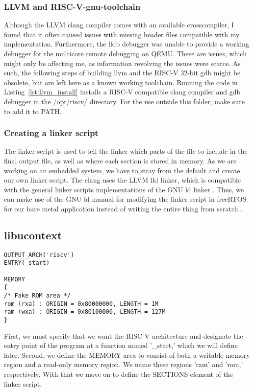 \subsubsection*{LLVM and RISC-V-gnu-toolchain}
Although the LLVM clang compiler comes with an available crosscompiler, I found
that it often caused issues with missing header files compatible with my
implementation. Furthermore, the lldb debugger was unable to provide a working
debugger for the multicore remote debugging on QEMU. These are issues, which
might only be affecting me, as information revolving the issues were scarce. As
such, the following steps of building llvm and the RISC-V 32-bit gdb might be
obsolete, but are left here as a known working toolchain. Running the code in
Listing~\ref{lst:llvm_install} installs a RISC-V compatible clang compiler and
gdb debugger in the /opt/riscv/ directory. For the use outside this folder, make
sure to add it to PATH.


\subsubsection{Creating a linker script}
The linker script is used to tell the linker which parts of the file to include
in the final output file, as well as where each section is stored in memory. As
we are working on an embedded system, we have to stray from the default and
create our own linker script. The clang uses the LLVM lld linker, which is
compatible with the general linker scripts implementations of the GNU ld linker
\cite{llvm-org-linker}. Thus, we can make use of the GNU ld manual for modifying
the linker script in freeRTOS for our bare metal application instead of writing
the entire thing from scratch \cite{GNU-linker}.

\subsection{libucontext}


\begin{lstlisting}
OUTPUT_ARCH('riscv')
ENTRY(_start)

MEMORY
{
/* Fake ROM area */
rom (rxa) : ORIGIN = 0x80000000, LENGTH = 1M
ram (wxa) : ORIGIN = 0x80100000, LENGTH = 127M
}
\end{lstlisting}
First, we must specify that we want the RISC-V architecture and designate the entry point
of the program at a function named '\_start,' which we will define later.
Second, we define the MEMORY area to consist of both a writable memory region and a read-only
memory region. We name these regions 'ram' and 'rom,' respectively. With that we move on to define the SECTIONS element of the linker script.

